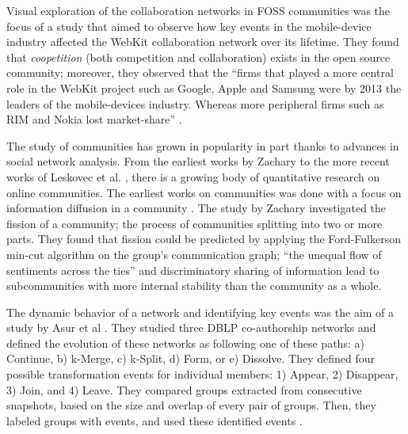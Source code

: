 \documentclass[11pt]{report}
\begin{document}
Visual exploration of the collaboration networks in FOSS communities was the focus of a study that aimed to observe how key events in the mobile-device industry affected the WebKit collaboration network over its lifetime. \cite{JoseWebKit} They found that \textit{coopetition} (both competition and collaboration) exists in the open source community; moreover, they observed that the ``firms that played a more central role in the WebKit project such as Google, Apple and Samsung were by 2013 the leaders of the mobile-devices industry. Whereas more peripheral firms such as RIM and Nokia lost market-share'' \cite{JoseWebKit}. 

The study of communities has grown in popularity in part thanks to advances in social network analysis.  From the earliest works by Zachary \cite{Zachary} to the more recent works of Leskovec et al. \cite{LeskovecGraphsOverTime}\cite{LeskovecStatisticalPropertiesOfCommunityStructure}, there is a growing body of quantitative research on online communities. The earliest works on communities was done with a focus on information diffusion in a community \cite{Zachary}. The study by Zachary investigated the fission of a community; the process of communities splitting into two or more parts. They found that fission could be predicted by applying the Ford-Fulkerson min-cut algorithm \cite{Ford} on the group's communication graph; ``the unequal flow of sentiments across the ties'' and discriminatory sharing of information lead to subcommunities with more internal stability than the community as a whole.\cite{Zachary}

The dynamic behavior of a network and identifying key events was the aim of a study by Asur et al \cite{Asur}. They studied three DBLP co-authorship networks and defined the evolution of these networks as following one of these paths: a) Continue, b) k-Merge, c) k-Split, d) Form, or e) Dissolve. They defined four possible transformation events for individual members: 1) Appear, 2) Disappear, 3) Join, and 4) Leave. They compared groups extracted from consecutive snapshots, based on the size and overlap of every pair of groups. Then, they labeled groups with events, and used these identified events \cite{Asur}.
\end{document}
